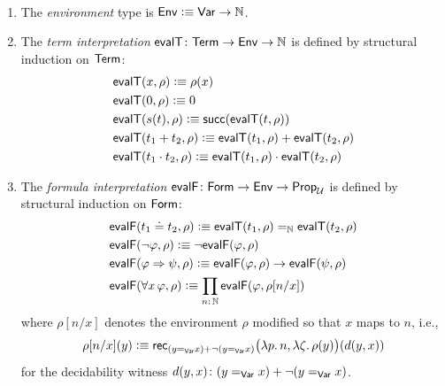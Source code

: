 \begin{defns}\ 
    \begin{enumerate}[-]
        \item The \textsl{environment} type is $\mathsf{Env}\mathrel{\vcentcolon}\equiv\mathsf{Var}\to\mathbb{N}$.
    
        \item The \textsl{term interpretation\/} $\fun{evalT}\colon\fun{Term}\to\fun{Env}\to\N$ is defined by structural induction on $\mathsf{Term}$:
        \begin{align*}
            &\mathsf{evalT}(x,\rho)\mathrel{\vcentcolon}\equiv\rho(x)\\
            &\mathsf{evalT}(0,\rho)\mathrel{\vcentcolon}\equiv0\\
            &\mathsf{evalT}(s(t),\rho)\mathrel{\vcentcolon}\equiv\mathsf{succ}(
                \mathsf{evalT}(t,\rho)
            )\\
            &\mathsf{evalT}(t_1+t_2,\rho)
                \mathrel{\vcentcolon}\equiv\mathsf{evalT}(t_1,\rho)
                    +\mathsf{evalT}(t_2,\rho)\\
            &\mathsf{evalT}(t_1\cdot t_2,\rho)
                \mathrel{\vcentcolon}\equiv\mathsf{evalT}(t_1,\rho)
                    \cdot\mathsf{evalT}(t_2,\rho)
        \end{align*}

        \item The \textsl{formula interpretation} $\fun{evalF}\colon\fun{Form}\to\fun{Env}\to\fun{Prop}_\univ$ is defined by structural induction on $\mathsf{Form}$:
        \begin{align*}
            &\fun{evalF}(t_1\doteq t_2,\rho) 
                \defeq \fun{evalT}(t_1, \rho) \eq{\N} \fun{evalT}(t_2, \rho)\\
            &\fun{evalF}(\neg\varphi, \rho) 
                \defeq \neg\fun{evalF}(\varphi, \rho)\\
            &\fun{evalF}(\varphi\imp\psi, \rho) 
                \defeq \fun{evalF}(\varphi, \rho) \to \fun{evalF}(\psi, \rho)\\
            &\fun{evalF}(\forall x\,\varphi, \rho) 
                \defeq \prod_{n\colon\N} \fun{evalF}(\varphi, \rho[n/x])
        \end{align*}
        where $\rho[n/x]$ denotes the environment $\rho$ modified so that $x$ maps to $n$, i.e.,
        \[
            \rho[n/x](y)\mathrel{\vcentcolon}\equiv\mathsf{rec}_{
                (y\mathrel{=_{\mathsf{Var}}}x)+\neg(y\mathrel{=_{\mathsf{Var}}}x)
            }\bigl(
                \lambda p.\,n, 
                \lambda\zeta.\,\rho(y)
            \bigr)(d(y,x))
        \]
        for the decidability witness $d(y,x)\colon(y\eq{\fun{Var}}x)+\neg(y\eq{\fun{Var}}x)$.
    \end{enumerate}
\end{defns}

